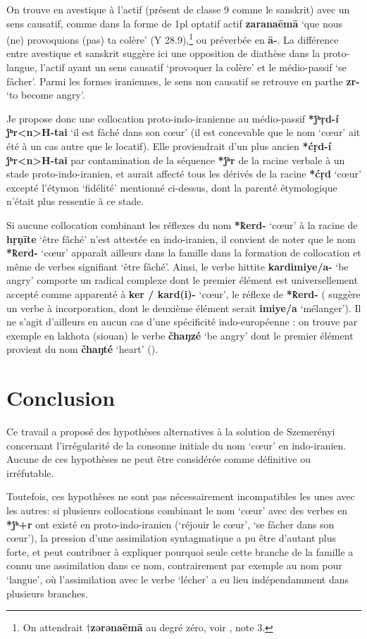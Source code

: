 \documentclass{article}
\newcommand{\ipa}[1]{{\phon\textbf{#1}}}
\begin{document}
On trouve en avestique à l'actif (présent de classe 9 comme le sanskrit) avec un sens causatif, comme dans la forme de 1pl optatif actif \ipa{zaranaēmā} `que nous (ne) provoquions (pas) ta colère' (Y 28.9),\footnote{On attendrait $\dagger$\ipa{zərənaēmā} au degré zéro, voir \citet[178]{liv}, note 3.  } ou préverbée en \ipa{ā-}. La différence entre avestique et sanskrit suggère ici une opposition de diathèse dans la proto-langue, l'actif ayant un sens causatif `provoquer la colère' et le médio-passif `se fâcher'. Parmi les formes iraniennes, le sens non causatif se retrouve en parthe \ipa{zr-} `to become angry'.


Je propose donc une collocation proto-indo-iranienne au médio-passif \ipa{*j́ʰṛd-í j́ʰr<n>H-tai} `il est fâché dans son cœur' (il est concevable que le nom `cœur' ait été à un cas autre que le locatif).  Elle proviendrait d'un plus ancien \ipa{*ćṛd-í j́ʰr<n>H-tai} par contamination de la séquence \ipa{*j́ʰr} de la racine verbale à un stade proto-indo-iranien, et aurait affecté tous les dérivés de la racine \ipa{*ćṛd} `cœur' excepté l'étymon `fidélité' mentionné ci-dessus, dont la parenté étymologique n'était plus ressentie à ce stade.

Si aucune collocation combinant les réflexes du nom \ipa{*k̂erd-} `cœur' à la racine de \ipa{hṛṇīte} `être fâché' n'est attestée en indo-iranien, il convient de noter que  le nom \ipa{*k̂erd-} `cœur' apparaît ailleurs dans la famille dans  la formation de collocation et même de verbes signifiant `être fâché'. Ainsi, le verbe hittite  \ipa{kardimiye/a-} `be angry' comporte un radical complexe dont le premier élément est universellement accepté comme apparenté à \ipa{ker / kard(i)-} `cœur', le réflexe de \ipa{*k̂erd-} (\citealt[456-7]{kloekhorst08edhil} suggère un verbe à incorporation, dont le deuxième élément serait \ipa{imiye/a} `mélanger'). Il ne s'agit d'ailleurs en aucun cas d'une spécificité indo-européenne : on trouve par exemple en lakhota (siouan) le verbe  \ipa{čhaŋzé} `be angry' dont le premier élément provient du nom \ipa{čhaŋté} `heart' (\citealt{ullrich08}).

\section*{Conclusion}
Ce travail a proposé des hypothèses alternatives à la solution de Szemerényi concernant l'irrégularité de la consonne initiale du nom `cœur' en indo-iranien. Aucune de ces hypothèses ne peut être considérée comme définitive ou irréfutable. 

Toutefois, ces hypothèses ne sont pas nécessairement incompatibles les unes avec les autres: si plusieurs collocations combinant le nom `cœur' avec des verbes en \ipa{*j́ʰ+r} ont existé en proto-indo-iranien (`réjouir le cœur', `se fâcher dans son cœur'), la pression d'une assimilation syntagmatique a pu être d'autant plus forte, et peut contribuer à expliquer pourquoi seule cette branche de la famille a connu une assimilation dans ce nom, contrairement par exemple au nom pour `langue', où l'assimilation avec le verbe `lécher' a eu lieu indépendamment dans plusieurs branches.




\end{document}

